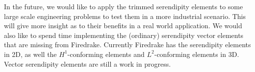 \documentclass[manuscript,screen]{acmart}
\begin{document}
In the future, we would like to apply the trimmed serendipity elements to some large scale engineering problems to test them in a more industrial scenario.  This will give more insight as to their benefits in a real world application.  We would also like to spend time implementing the (ordinary) serendipity vector elements that are  missing from Firedrake.  Currently Firedrake has the serendipity elements in 2D, as well the $H^1$-conforming elements and $L^2$-conforming elements in 3D.  Vector serendipity elements are still a work in progress.



    

\end{document}
